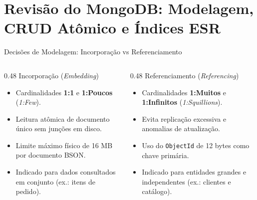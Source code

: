 \section[Revisão MongoDB: CRUD e ESR]{Revisão do MongoDB: Modelagem, CRUD Atômico e Índices ESR}

\begin{frame}[fragile]{Decisões de Modelagem: Incorporação vs Referenciamento}
  \vspace{0.1cm}
  \begin{columns}[t,onlytextwidth]
    \begin{column}{0.48\textwidth}
      \alert{Incorporação (\textit{Embedding})}\par
      \footnotesize
      \begin{itemize}
        \item Cardinalidades \textbf{1:1} e \textbf{1:Poucos} (\textit{1:Few}).
        \item Leitura atômica de documento único sem junções em disco.
        \item Limite máximo físico de 16 MB por documento BSON.
        \item Indicado para dados consultados em conjunto (ex.: itens de pedido).
      \end{itemize}
    \end{column}
    
    \begin{column}{0.48\textwidth}
      \alert{Referenciamento (\textit{Referencing})}\par
      \footnotesize
      \begin{itemize}
        \item Cardinalidades \textbf{1:Muitos} e \textbf{1:Infinitos} (\textit{1:Squillions}).
        \item Evita replicação excessiva e anomalias de atualização.
        \item Uso do \lstinline[language=mongosh, basicstyle=\footnotesize\ttfamily]|ObjectId| de 12 bytes como chave primária.
        \item Indicado para entidades grandes e independentes (ex.: clientes e catálogo).
      \end{itemize}
    \end{column}
  \end{columns}
\end{frame}

